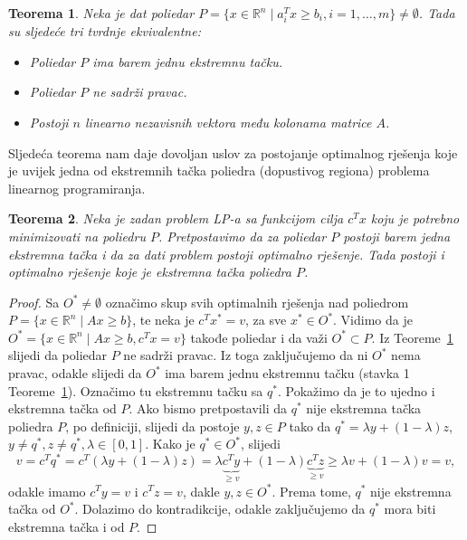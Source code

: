 \documentclass[a4paper, utf8, 11pt, colorlinks]{book}
\newtheorem{thm}{Teorema}[chapter]
\theoremstyle{definition}
\begin{document}
\begin{thm}\label{thm:pravac}
   Neka je dat poliedar $P=\{ x \in \mathbb{R}^n  \mid a_i^T x \geq b_i, i=1,\ldots,m\} \neq \emptyset$. Tada su sljedeće tri tvrdnje ekvivalentne:
   \begin{itemize}
       \item  Poliedar $P$ ima barem jednu ekstremnu tačku.
       \item Poliedar $P$ ne sadrži pravac.
       \item Postoji $n$ linearno nezavisnih vektora  među kolonama matrice $A$. %
   \end{itemize}
\end{thm}

Sljedeća teorema nam daje dovoljan uslov za postojanje optimalnog rješenja koje je uvijek jedna od ekstremnih tačka poliedra (dopustivog regiona) problema linearnog programiranja.

\begin{thm}
   Neka je zadan problem LP-a sa funkcijom cilja $c^Tx$ koju je potrebno minimizovati na poliedru $P$. Pretpostavimo da za poliedar $P$ postoji barem jedna ekstremna tačka i da za dati problem postoji optimalno rješenje. Tada postoji i optimalno rješenje koje je ekstremna tačka poliedra $P$.
\end{thm}

\begin{proof}
         Sa $O^* \not = \emptyset$ označimo skup svih optimalnih rješenja  nad poliedrom $P= \{ x \in \mathbb{R}^n \mid A x \geq b \}$, te neka je $c^T x^* = v$, za sve $x^* \in O^*$. Vidimo da je 
         $O^* = \{ x \in \mathbb{R}^n \mid A x \geq b, c^T x = v  \}$ takođe poliedar i da važi $O^* \subset P$. Iz Teoreme~\ref{thm:pravac} slijedi da poliedar $P$ ne sadrži pravac. Iz toga zaključujemo da ni $O^*$ nema pravac, odakle slijedi da $O^*$ ima barem jednu ekstremnu tačku (stavka 1 Teoreme~\ref{thm:pravac}). Označimo tu ekstremnu tačku sa $q^*$. Pokažimo da je to ujedno i ekstremna tačka od $P$.  Ako bismo pretpostavili da $q^*$ nije ekstremna tačka poliedra $P$, po definiciji, slijedi da postoje $y, z \in P$ tako da $q^* = \lambda y + ( 1 - \lambda ) z $, $y \neq q^*, z \neq q^*, \lambda \in [0, 1]$. Kako je $q^* \in O^*$, slijedi 
         $$ v = c^T q^* = c^T (  \lambda y + ( 1 - \lambda ) z ) = \lambda 
        \underbrace{ c^T y}_{ \geq v} + ( 1 - \lambda ) \underbrace{c^T z}_{\geq v} \geq \lambda v + (1 - \lambda) v = v,$$
        odakle imamo $c^T y = v$ i $c^T z = v$, dakle $y, z \in O^*$. Prema tome, $q^*$ nije ekstremna tačka od $O^*$. Dolazimo do kontradikcije, odakle zaključujemo da $q^*$ mora biti  ekstremna tačka i od  $P$.
\end{proof}
 
\end{document}
